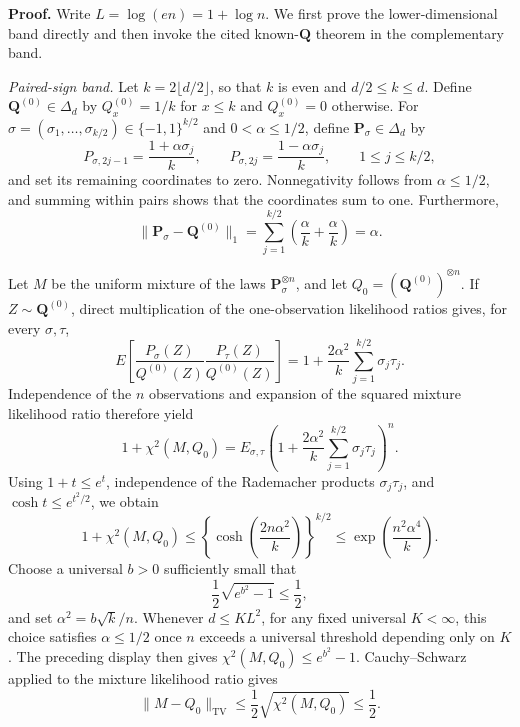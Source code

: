 \textbf{Proof.}
Write \(L=\log(en)=1+\log n\).  We first prove the lower-dimensional band directly and then invoke the cited known-\(\mathbf Q\) theorem in the complementary band.

\emph{Paired-sign band.}
Let \(k=2\lfloor d/2\rfloor\), so that \(k\) is even and \(d/2\le k\le d\).  Define \(\mathbf Q^{(0)}\in\Delta_d\) by \(Q^{(0)}_x=1/k\) for \(x\le k\) and \(Q^{(0)}_x=0\) otherwise.  For \(\sigma=(\sigma_1,\ldots,\sigma_{k/2})\in\{-1,1\}^{k/2}\) and \(0<\alpha\le1/2\), define \(\mathbf P_\sigma\in\Delta_d\) by
\[
 P_{\sigma,2j-1}=\frac{1+\alpha\sigma_j}{k},\qquad
 P_{\sigma,2j}=\frac{1-\alpha\sigma_j}{k},
 \qquad 1\le j\le k/2,
\]
and set its remaining coordinates to zero.  Nonnegativity follows from \(\alpha\le1/2\), and summing within pairs shows that the coordinates sum to one.  Furthermore,
\[
 \lVert\mathbf P_\sigma-\mathbf Q^{(0)}\rVert_1
 =\sum_{j=1}^{k/2}\left(\frac{\alpha}{k}+\frac{\alpha}{k}\right)
 =\alpha .
\]

Let \(M\) be the uniform mixture of the laws \(\mathbf P_\sigma^{\otimes n}\), and let \(Q_0=(\mathbf Q^{(0)})^{\otimes n}\).  If \(Z\sim\mathbf Q^{(0)}\), direct multiplication of the one-observation likelihood ratios gives, for every \(\sigma,\tau\),
\[
 E\left[
 \frac{P_\sigma(Z)}{Q^{(0)}(Z)}
 \frac{P_\tau(Z)}{Q^{(0)}(Z)}
 \right]
 =1+\frac{2\alpha^2}{k}\sum_{j=1}^{k/2}\sigma_j\tau_j.
\]
Independence of the \(n\) observations and expansion of the squared mixture likelihood ratio therefore yield
\[
 1+\chi^2(M,Q_0)
 =E_{\sigma,\tau}\left(
 1+\frac{2\alpha^2}{k}\sum_{j=1}^{k/2}\sigma_j\tau_j
 \right)^n.
\]
Using \(1+t\le e^t\), independence of the Rademacher products \(\sigma_j\tau_j\), and \(\cosh t\le e^{t^2/2}\), we obtain
\[
 1+\chi^2(M,Q_0)
 \le
 \left\{\cosh\left(\frac{2n\alpha^2}{k}\right)\right\}^{k/2}
 \le \exp\left(\frac{n^2\alpha^4}{k}\right).
\]
Choose a universal \(b>0\) sufficiently small that
\[
 \frac12\sqrt{e^{b^2}-1}\le\frac12,
\]
and set \(\alpha^2=b\sqrt{k}/n\).  Whenever \(d\le K L^2\), for any fixed universal \(K<\infty\), this choice satisfies \(\alpha\le1/2\) once \(n\) exceeds a universal threshold depending only on \(K\).  The preceding display then gives \(\chi^2(M,Q_0)\le e^{b^2}-1\).  Cauchy--Schwarz applied to the mixture likelihood ratio gives
\[
 \lVert M-Q_0\rVert_{\mathrm{TV}}
 \le\frac12\sqrt{\chi^2(M,Q_0)}\le\frac12.
\]

